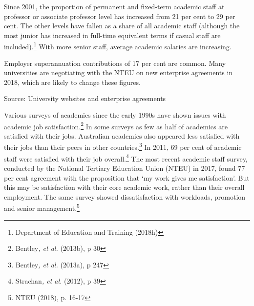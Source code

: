 \documentclass{grattan}
\begin{document}
Since 2001, the proportion of permanent and fixed-term academic staff at professor or associate professor level has increased from 21 per cent to 29 per cent. The other levels have fallen as a share of all academic staff (although the most junior has increased in full-time equivalent terms if casual staff are included).\footnote{Department of Education and Training (2018h)} With more senior staff, average academic salaries are increasing.

\begin{table} \caption{Academic pay ranges, 2018}


\end{table}

Employer superannuation contributions of 17 per cent are common. Many universities are negotiating with the NTEU on new enterprise agreements in 2018, which are likely to change these figures.

Source: University websites and enterprise agreements

Various surveys of academics since the early 1990s have shown issues with academic job satisfaction.\footnote{Bentley\emph{, et al.} (2013b), p 30} In some surveys as few as half of academics are satisfied with their jobs. Australian academics also appeared less satisfied with their jobs than their peers in other countries.\footnote{Bentley\emph{, et al.} (2013a), p 247} In 2011, 69 per cent of academic staff were satisfied with their job overall.\footnote{Strachan\emph{, et al.} (2012), p 39} The most recent academic staff survey, conducted by the National Tertiary Education Union (NTEU) in 2017, found 77 per cent agreement with the proposition that `my work gives me satisfaction'. But this may be satisfaction with their core academic work, rather than their overall employment. The same survey showed dissatisfaction with workloads, promotion and senior management.\footnote{NTEU (2018), p. 16-17}

%
\end{document}

